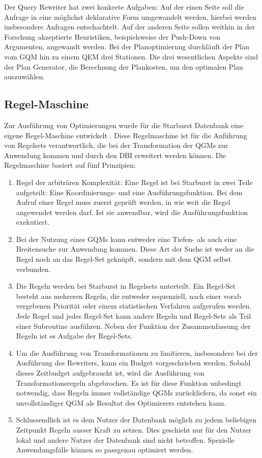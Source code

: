 Der Query Rewriter hat zwei konkrete Aufgaben: Auf der einen Seite soll die Anfrage in eine möglichst deklarative Form umgewandelt werden, hierbei werden insbesondere Anfragen entschachtelt. Auf der anderen Seite sollen weithin in der Forschung akzeptierte Heuristiken, beispielsweise der Push-Down von Argumenten, angewandt werden.
Bei der Planoptimierung durchläuft der Plan vom \ac{GQM} hin zu einem QEM drei Stationen. Die drei wesentlichen Aspekte sind der Plan Generator, die Berechnung der Plankosten, um den optimalen Plan auszuwählen. 

\subsection{Regel-Maschine}

Zur Ausführung von Optimierungen wurde für die Starburst Datenbank eine eigene Regel-Maschine entwickelt \cite{lohman1988Starbust}. Diese Regelmaschine ist für die Anführung von Regelsets verantwortlich, die bei der Transformation der QGMs zur Anwendung kommen und durch den \ac{DBI}  erweitert werden können. Die Regelmaschine basiert auf fünf Prinzipien:

\begin{enumerate}
\item Regel der arbiträren Komplexität: Eine Regel ist bei Starburst in zwei Teile aufgeteilt: Eine Koordinierungs- und eine Ausführungsfunktion. Bei dem Aufruf einer Regel muss zuerst geprüft werden, in wie weit die Regel angewendet werden darf. Ist sie anwendbar, wird die Ausführungsfunktion exekutiert.

\item Bei der Nutzung eines GQMs kann entweder eine Tiefen- als auch eine Breitensuche zur Anwendung kommen. Diese Art der Suche ist weder an die Regel noch an das Regel-Set geknüpft, sondern mit dem QGM selbst verbunden.


\item Die Regeln werden bei Starburst in Regelsets unterteilt. Ein Regel-Set besteht aus mehreren Regeln, die entweder sequenziell, nach einer vorab vergebenen Priorität oder einem statistischen Verfahren aufgerufen werden. Jede Regel und jedes Regel-Set kann andere Regeln und Regel-Sets als Teil einer Subroutine ausführen. Neben der Funktion der Zusammenfassung der Regeln ist es Aufgabe der Regel-Sets.

\item Um die Ausführung von Transformationen zu limitieren, insbesondere bei der Ausführung des Rewriters, kann ein Budget vorgeschrieben werden. Sobald dieses Zeitbudget aufgebraucht ist, wird die Ausführung von Transformationsregeln abgebrochen. Es ist für diese Funktion unbedingt notwendig, dass Regeln immer vollständige QGMs zurückliefern, da sonst ein unvollständiger QGM als Resultat des Optimierers entstehen kann.

\item Schlussendlich ist es dem Nutzer der Datenbank möglich zu jedem beliebigen Zeitpunkt Regeln ausser Kraft zu setzen. Dies geschieht nur für den Nutzer lokal und andere Nutzer der Datenbank sind nicht betroffen. Spezielle Anwendungsfälle können so passgenau optimiert werden.
\end{enumerate}

